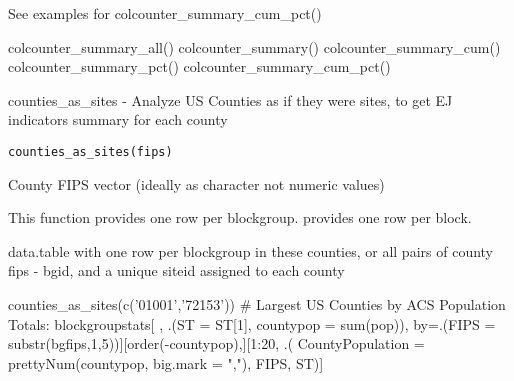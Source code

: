 \documentclass[a4paper]{book}
\begin{document}
%
\begin{Details}\relax
See examples for colcounter\_summary\_cum\_pct()
\end{Details}
%
\begin{SeeAlso}\relax
colcounter\_summary\_all() colcounter\_summary() colcounter\_summary\_cum() colcounter\_summary\_pct() colcounter\_summary\_cum\_pct()
\end{SeeAlso}
%
\begin{Description}\relax
counties\_as\_sites - Analyze US Counties as if they were sites, to get EJ indicators summary for each county
\end{Description}
%
\begin{Usage}
\begin{verbatim}
counties_as_sites(fips)
\end{verbatim}
\end{Usage}
%
\begin{Arguments}
\begin{ldescription}
\item[\code{fips}] County FIPS vector (ideally as character not numeric values)
\end{ldescription}
\end{Arguments}
%
\begin{Details}\relax
This function provides one row per blockgroup.
 provides one row per block.
\end{Details}
%
\begin{Value}
data.table with one row per blockgroup in these counties, or
all pairs of county fips - bgid, and a unique siteid assigned to each county
\end{Value}
%
\begin{SeeAlso}\relax
{}
\end{SeeAlso}
%
\begin{Examples}
\begin{ExampleCode}
 counties_as_sites(c('01001','72153'))
 # Largest US Counties by ACS Population Totals:
 blockgroupstats[ , .(ST = ST[1], countypop = sum(pop)),
  by=.(FIPS = substr(bgfips,1,5))][order(-countypop),][1:20, .(
  CountyPopulation = prettyNum(countypop, big.mark = ","), FIPS, ST)]
 
\end{ExampleCode}
\end{Examples}
\end{document}
